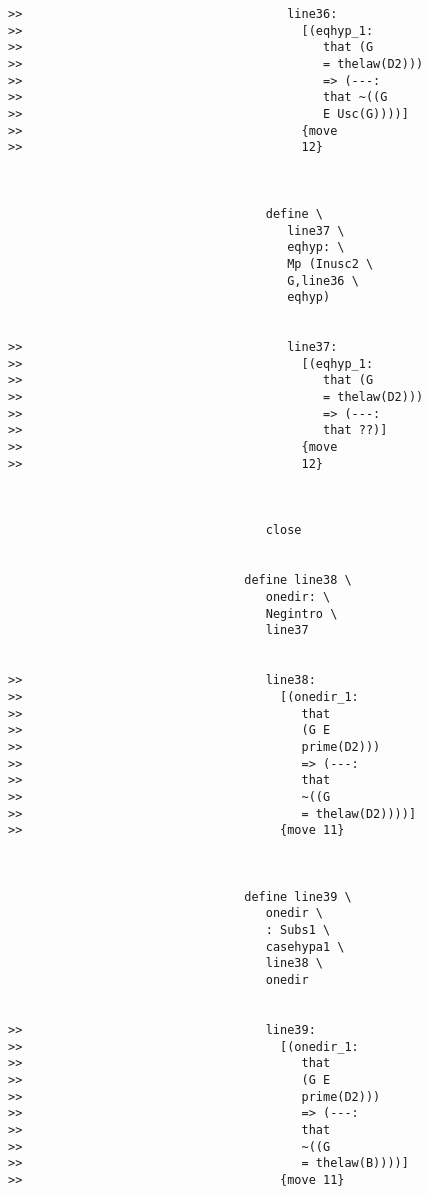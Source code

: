 \documentclass[12pt]{article}
\begin{document}
\begin{verbatim}
>>                                     line36:
>>                                       [(eqhyp_1:
>>                                          that (G
>>                                          = thelaw(D2)))
>>                                          => (---:
>>                                          that ~((G
>>                                          E Usc(G))))]
>>                                       {move
>>                                       12}



                                    define \
                                       line37 \
                                       eqhyp: \
                                       Mp (Inusc2 \
                                       G,line36 \
                                       eqhyp)


>>                                     line37:
>>                                       [(eqhyp_1:
>>                                          that (G
>>                                          = thelaw(D2)))
>>                                          => (---:
>>                                          that ??)]
>>                                       {move
>>                                       12}



                                    close


                                 define line38 \
                                    onedir: \
                                    Negintro \
                                    line37


>>                                  line38:
>>                                    [(onedir_1:
>>                                       that
>>                                       (G E
>>                                       prime(D2)))
>>                                       => (---:
>>                                       that
>>                                       ~((G
>>                                       = thelaw(D2))))]
>>                                    {move 11}



                                 define line39 \
                                    onedir \
                                    : Subs1 \
                                    casehypa1 \
                                    line38 \
                                    onedir


>>                                  line39:
>>                                    [(onedir_1:
>>                                       that
>>                                       (G E
>>                                       prime(D2)))
>>                                       => (---:
>>                                       that
>>                                       ~((G
>>                                       = thelaw(B))))]
>>                                    {move 11}




\end{verbatim}
\end{document}
